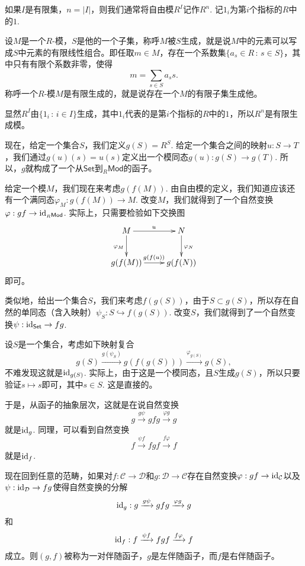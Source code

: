 如果$I$是有限集，$n=|I|$，则我们通常将自由模$R^I$记作$R^n$. 记$1_i$为第$i$个指标的$R$中的$1$.

\begin{para}
设$M$是一个$R$-模，$S$是他的一个子集，称呼$M$被$S$生成，就是说$M$中的元素可以写成$S$中元素的有限线性组合。即任取$m\in M$，存在一个系数集$\{a_s\in R\,:\, s\in S\}$，其中只有有限个系数非零，使得
\[
	m=\sum_{s\in S}a_s s.
\]
称呼一个$R$-模$M$是有限生成的，就是说存在一个$M$的有限子集生成他。
\end{para}

显然$R^I$由$\{1_i\,:\,i\in I\}$生成，其中$1_i$代表的是第$i$个指标的$R$中的$1$，所以$R^n$是有限生成模。

\begin{para}
现在，给定一个集合$S$，我们定义$g(S)=R^S$. 给定一个集合之间的映射$u:S\to T$，我们通过$g(u)(s)=u(s)$定义出一个模同态$g(u):g(S)\to g(T)$. 所以，$g$就构成了一个从$\mathsf{Set}$到${}_R\mathsf{Mod}$的函子。

给定一个模$M$，我们现在来考虑$g(f(M))$. 由自由模的定义，我们知道应该还有一个满同态$\varphi_M:g(f(M))\to M$. 改变$M$，我们就得到了一个自然变换$\varphi:gf\to \operatorname{id}_{{}_R\mathsf{Mod}}$. 实际上，只需要检验如下交换图
\[
	\xymatrix{
	M\ar[d]_{\varphi_M}\ar[r]^u&N\ar[d]^{\varphi_N}\\
	g(f(M))\ar[r]^{g(f(u))}&g(f(N))\\
	}
\]
即可。

类似地，给出一个集合$S$，我们来考虑$f(g(S))$，由于$S\subset g(S)$，所以存在自然的单同态（含入映射）$\psi_S:S\hookrightarrow f(g(S))$. 改变$S$，我们就得到了一个自然变换$\psi:\operatorname{id}_{\mathsf{Set}}\to fg$.

设$S$是一个集合，考虑如下映射复合
\[
	g(S)\xrightarrow{g(\psi_S)}g(f(g(S)))\xrightarrow{\varphi_{g(S)}}g(S),
\]
不难发现这就是$\operatorname{id}_{g(S)}$. 实际上，由于这是一个模同态，且$S$生成$g(S)$，所以只要验证$s\mapsto s$即可，其中$s\in S$. 这是直接的。

于是，从函子的抽象层次，这就是在说自然变换
\[
	g\xrightarrow{g \psi}gfg\xrightarrow{\varphi g}g
\]
就是$\operatorname{id}_g$. 同理，可以看到自然变换
\[
	f\xrightarrow{\psi f}fgf\xrightarrow{f \varphi}f
\]
就是$\operatorname{id}_f$.
\end{para}

\begin{para}
现在回到任意的范畴，如果对$f:\mathcal{C}\to \mathcal{D}$和$g:\mathcal{D}\to \mathcal{C}$存在自然变换$\varphi:gf\to \operatorname{id}_{\mathcal{C}}$以及$\psi:\operatorname{id}_{\mathcal{D}}\to fg$使得自然变换的分解
\[
	\operatorname{id}_g:g\xrightarrow{g \psi}gfg\xrightarrow{\varphi g}g
\]
和
\[
	\operatorname{id}_f:f\xrightarrow{\psi f}fgf\xrightarrow{f \varphi}f
\]
成立。则$(g,f)$被称为一对伴随函子，$g$是左伴随函子，而$f$是右伴随函子。
\end{para}

